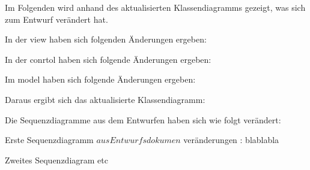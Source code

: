Im Folgenden wird anhand des aktualisierten Klassendiagramms gezeigt, was sich zum Entwurf verändert hat.


In der view haben sich folgenden Änderungen ergeben:

In der conrtol haben sich folgende Änderungen ergeben:

Im model haben sich folgende Änderungen ergeben: %

Daraus ergibt sich das aktualisierte Klassendiagramm:


Die Sequenzdiagramme aus dem Entwurfen haben sich wie folgt verändert:

Erste Sequenzdiagramm \(aus Entwurfsdokumen\) 
 veränderungen : blablabla
 
 Zweites Sequenzdiagram
 etc
